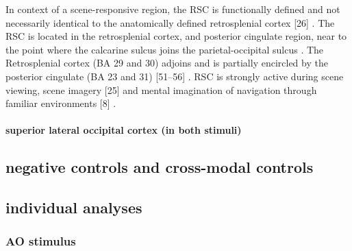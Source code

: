 \documentclass[english]{article}
\begin{document}
In context of a scene-responsive region, the RSC is functionally defined and not
necessarily identical to the anatomically defined retrosplenial cortex [26]
\citep{epstein2008parahippocampal}.
The RSC is located in the retrosplenial cortex, and posterior cingulate region,
near to the point where the calcarine sulcus joins the parietal-occipital sulcus
\citep{epstein2008parahippocampal}.
The Retrosplenial cortex (BA 29 and 30) adjoins and is partially encircled by
the posterior cingulate (BA 23 and 31) [51–56]
\citep{epstein2008parahippocampal}.
RSC is strongly active during scene viewing, scene imagery [25] and mental
imagination of navigation through familiar environments [8]
\citep{epstein2008parahippocampal}.


\paragraph{superior lateral occipital cortex (in both stimuli)}




\subsection{negative controls and cross-modal controls}



\subsection{individual analyses}




\subsubsection{AO stimulus}

\end{document}
